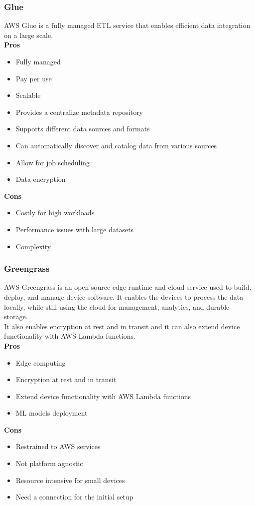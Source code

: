         \subsubsection{Glue}
        \label{aws:glue}
        AWS Glue is a fully managed ETL service that enables efficient data integration on a large scale.\\
        \textbf{Pros}
        \begin{itemize}
            \item Fully managed
            \item Pay per use
            \item Scalable
            \item Provides a centralize metadata repository
            \item Supports different data sources and formats
            \item Can automatically discover and catalog data from various sources
            \item Allow for job scheduling
            \item Data encryption
        \end{itemize}
        \textbf{Cons}
        \begin{itemize}
            \item Costly for high workloads
            \item Performance issues with large datasets
            \item Complexity
        \end{itemize}

        \subsubsection{Greengrass}
        \label{aws:greengrass}
        AWS Greengrass is an open source edge runtime and cloud service used to build, deploy, and manage device software. 
        It enables the devices to process the data locally, while still using the cloud for management, analytics, and durable storage.\\
        It also enables encryption at rest and in transit and it can also extend device functionality with AWS Lambda functions.\\
        \textbf{Pros}
        \begin{itemize}
            \item Edge computing
            \item Encryption at rest and in transit
            \item Extend device functionality with AWS Lambda functions
            \item ML models deployment
        \end{itemize}
        \textbf{Cons}
        \begin{itemize}
            \item Restrained to AWS services
            \item Not platform agnostic
            \item Resource intensive for small devices
            \item Need a connection for the initial setup
        \end{itemize}
        

